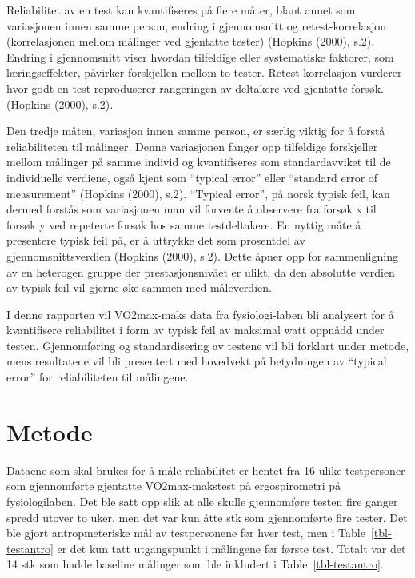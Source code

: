 \documentclass[
  letterpaper,
  DIV=11,
  numbers=noendperiod]{scrreprt}
\begin{document}
Reliabilitet av en test kan kvantifiseres på flere måter, blant annet
som variasjonen innen samme person, endring i gjennomsnitt og
retest-korrelasjon (korrelasjonen mellom målinger ved gjentatte tester)
(Hopkins (2000), s.2). Endring i gjennomsnitt viser hvordan tilfeldige
eller systematiske faktorer, som læringseffekter, påvirker forskjellen
mellom to tester. Retest-korrelasjon vurderer hvor godt en test
reproduserer rangeringen av deltakere ved gjentatte forsøk. (Hopkins
(2000), s.2).

Den tredje måten, variasjon innen samme person, er særlig viktig for å
forstå reliabiliteten til målinger. Denne variasjonen fanger opp
tilfeldige forskjeller mellom målinger på samme individ og kvantifiseres
som standardavviket til de individuelle verdiene, også kjent som
``typical error'' eller ``standard error of measurement'' (Hopkins
(2000), s.2). ``Typical error'', på norsk typisk feil, kan dermed
forstås som variasjonen man vil forvente å observere fra forsøk x til
forsøk y ved repeterte forsøk hos samme testdeltakere. En nyttig måte å
presentere typisk feil på, er å uttrykke det som prosentdel av
gjennomsnittsverdien (Hopkins (2000), s.2). Dette åpner opp for
sammenligning av en heterogen gruppe der prestasjonsnivået er ulikt, da
den absolutte verdien av typisk feil vil gjerne øke sammen med
måleverdien.

I denne rapporten vil VO2max-maks data fra fysiologi-laben bli analysert
for å kvantifisere reliabilitet i form av typisk feil av maksimal watt
oppnådd under testen. Gjennomføring og standardisering av testene vil
bli forklart under metode, mens resultatene vil bli presentert med
hovedvekt på betydningen av ``typical error'' for reliabiliteten til
målingene.

\section{Metode}\label{metode}

Dataene som skal brukes for å måle reliabilitet er hentet fra 16 ulike
testpersoner som gjennomførte gjentatte VO2max-makstest på
ergospirometri på fysiologilaben. Det ble satt opp slik at alle skulle
gjennomføre testen fire ganger spredd utover to uker, men det var kun
åtte stk som gjennomførte fire tester. Det ble gjort antropmeteriske mål
av testpersonene før hver test, men i Table~\ref{tbl-testantro} er det
kun tatt utgangspunkt i målingene før første test. Totalt var det 14 stk
som hadde baseline målinger som ble inkludert i
Table~\ref{tbl-testantro}.
\end{document}
